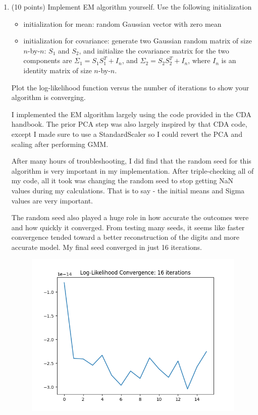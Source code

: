 \documentclass[twoside,12pt]{article}
\begin{document}
\begin{enumerate}[label*=\arabic*.]


\item (10 points) Implement EM algorithm yourself. Use the following initialization
\begin{itemize}
\item initialization for mean: random Gaussian vector with zero mean
\item initialization for covariance: generate two Gaussian random matrix of size $n$-by-$n$: $S_1$ and $S_2$, and initialize the covariance matrix for the two components are $\Sigma_1 = S_1 S_1^T + I_n$, and  $\Sigma_2 = S_2 S_2^T + I_n$, where $I_n$ is an identity matrix of size $n$-by-$n$. 
\end{itemize}
Plot the log-likelihood function versus the number of iterations to show your algorithm is converging.

I implemented the EM algorithm largely using the code provided in the CDA handbook. The prior PCA step was also largely inspired by that CDA code, except I made sure to use a StandardScaler so I could revert the PCA and scaling after performing GMM. 

After many hours of troubleshooting, I did find that the random seed for this algorithm is very important in my implementation. After triple-checking all of my code, all it took was changing the random seed to stop getting NaN values during my calculations. That is to say - the initial means and Sigma values are very important.

The random seed also played a huge role in how accurate the outcomes were and how quickly it converged. From testing many seeds, it seems like faster convergence tended toward a better reconstruction of the digits and more accurate model. My final seed converged in just 16 iterations.

  \begin{figure}[H]
        \centering
        \includegraphics[width=\textwidth, height=.5\textwidth]{images/gmm_LL_conversion.png}
    \end{figure}


\end{enumerate}
\end{document}
